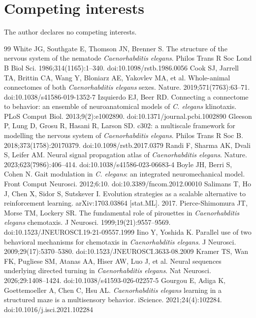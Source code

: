 \documentclass[11pt,a4paper]{article}
\begin{document}
\section*{Competing interests}
The author declares no competing interests.

\raggedright
\begin{thebibliography}{99}
 White JG, Southgate E, Thomson JN, Brenner S. The structure of the nervous system of the nematode \textit{Caenorhabditis elegans}. Philos Trans R Soc Lond B Biol Sci. 1986;314(1165):1--340. doi:10.1098/rstb.1986.0056
 Cook SJ, Jarrell TA, Brittin CA, Wang Y, Bloniarz AE, Yakovlev MA, et al. Whole-animal connectomes of both \textit{Caenorhabditis elegans} sexes. Nature. 2019;571(7763):63--71. doi:10.1038/s41586-019-1352-7
 Izquierdo EJ, Beer RD. Connecting a connectome to behavior: an ensemble of neuroanatomical models of \textit{C. elegans} klinotaxis. PLoS Comput Biol. 2013;9(2):e1002890. doi:10.1371/journal.pcbi.1002890
 Gleeson P, Lung D, Grosu R, Hasani R, Larson SD. c302: a multiscale framework for modelling the nervous system of \textit{Caenorhabditis elegans}. Philos Trans R Soc B. 2018;373(1758):20170379. doi:10.1098/rstb.2017.0379
 Randi F, Sharma AK, Dvali S, Leifer AM. Neural signal propagation atlas of \textit{Caenorhabditis elegans}. Nature. 2023;623(7986):406--414. doi:10.1038/s41586-023-06683-4
 Boyle JH, Berri S, Cohen N. Gait modulation in \textit{C. elegans}: an integrated neuromechanical model. Front Comput Neurosci. 2012;6:10. doi:10.3389/fncom.2012.00010
 Salimans T, Ho J, Chen X, Sidor S, Sutskever I. Evolution strategies as a scalable alternative to reinforcement learning. arXiv:1703.03864 [stat.ML]. 2017.
 Pierce-Shimomura JT, Morse TM, Lockery SR. The fundamental role of pirouettes in \textit{Caenorhabditis elegans} chemotaxis. J Neurosci. 1999;19(21):9557--9569. doi:10.1523/JNEUROSCI.19-21-09557.1999
 Iino Y, Yoshida K. Parallel use of two behavioral mechanisms for chemotaxis in \textit{Caenorhabditis elegans}. J Neurosci. 2009;29(17):5370--5380. doi:10.1523/JNEUROSCI.3633-08.2009
 Kramer TS, Wan FK, Pugliese SM, Atanas AA, Hiser AW, Luo J, et al. Neural sequences underlying directed turning in \textit{Caenorhabditis elegans}. Nat Neurosci. 2026;29:1408--1424. doi:10.1038/s41593-026-02257-5
 Gourgou E, Adiga K, Goettemoeller A, Chen C, Hsu AL. \textit{Caenorhabditis elegans} learning in a structured maze is a multisensory behavior. iScience. 2021;24(4):102284. doi:10.1016/j.isci.2021.102284

\end{thebibliography}
\end{document}
